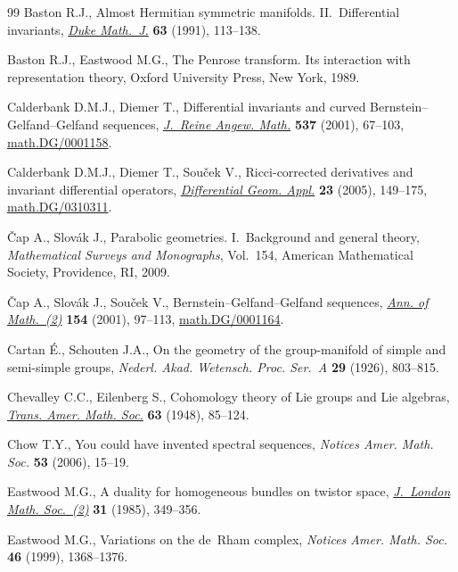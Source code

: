 \documentclass[11pt]{article}
\begin{document}
\begin{thebibliography}{99}
Baston R.J.,
Almost Hermitian symmetric manifolds. II.~Dif\/ferential invariants,
\href{http://dx.doi.org/10.1215/S0012-7094-91-06306-4}{{\it Duke Math.~J.}} {\bf 63} (1991), 113--138.

Baston R.J., Eastwood M.G.,
The Penrose transform. Its interaction with representation theory,
Oxford University Press, New York, 1989.

Calderbank D.M.J., Diemer T.,
Dif\/ferential invariants and curved Bernstein--Gelfand--Gelfand sequences,
\href{http://dx.doi.org/10.1515/crll.2001.059}{{\it J.~Reine Angew. Math.}} {\bf 537} (2001), 67--103,
\href{http://arxiv.org/abs/math.DG/0001158}{math.DG/0001158}.

Calderbank D.M.J., Diemer T., Sou\v{c}ek V.,
Ricci-corrected derivatives and invariant dif\/ferential operators,
\href{http://dx.doi.org/10.1016/j.difgeo.2004.07.009}{{\it Differential Geom. Appl.}} {\bf 23} (2005), 149--175,
\href{http://arxiv.org/abs/math.DG/0310311}{math.DG/0310311}.

\v{C}ap A., Slov\'ak J.,
Parabolic geometries. I.~Background and general theory,
{\it Mathematical Surveys and Monographs}, Vol.~154, American Mathematical Society, Providence, RI, 2009.

\v{C}ap A., Slov\'ak J.,  Sou\v{c}ek V.,
Bernstein--Gelfand--Gelfand sequences,
\href{http://dx.doi.org/10.2307/3062111}{{\it Ann. of Math.~(2)}} {\bf 154} (2001), 97--113,
\href{http://arxiv.org/abs/math.DG/0001164}{math.DG/0001164}.

Cartan \'E., Schouten J.A.,
On the geometry of the group-manifold of simple and semi-simple groups,
{\it Nederl. Akad. Wetensch. Proc. Ser.~A} {\bf 29} (1926), 803--815.

Chevalley C.C., Eilenberg S.,
Cohomology theory of Lie groups and Lie algebras,
\href{http://dx.doi.org/10.2307/1990637}{{\it Trans. Amer. Math. Soc.}} {\bf 63} (1948), 85--124.

Chow T.Y.,
You could have invented spectral sequences,
{\it Notices Amer. Math. Soc.} {\bf 53} (2006), 15--19.

Eastwood M.G.,
A duality for homogeneous bundles on twistor space,
\href{http://dx.doi.org/10.1112/jlms/s2-31.2.349}{{\it J.~London Math. Soc.~(2)}} {\bf 31} (1985), 349--356.

Eastwood M.G.,
Variations on the de~Rham complex,
{\it Notices Amer. Math. Soc.} {\bf 46} (1999), 1368--1376.


\end{thebibliography}
\end{document}
